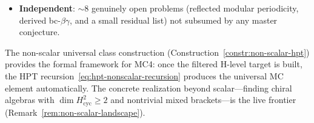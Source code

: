 \begin{remark}
\begin{itemize}
  conditions, AGT, Chern--Simons, and
  physics-dictionary statements
  (${\sim}20$ conjectures across
  Chapters~\ref{ch:feynman}, \ref{ch:bv-brst},
  \ref{ch:ht-boundary}, \ref{chap:physical-origins},
  \ref{ch:kontsevich-integral}).
  This is strictly downstream of MC3/MC4 and should not be read as a
  parallel structural frontier.
\item \textbf{Independent}: ${\sim}8$ genuinely open problems
  (reflected modular periodicity, derived bc-$\beta\gamma$, and a
  small residual list) not subsumed by any master conjecture.
\end{itemize}
The non-scalar universal class construction
(Construction~\ref{constr:non-scalar-hpt}) provides the formal
framework for MC4: once the filtered H-level target is built,
the HPT recursion~\eqref{eq:hpt-nonscalar-recursion} produces the
universal MC element automatically.  The concrete realization beyond
scalar---finding chiral algebras with
$\dim H^2_{\mathrm{cyc}} \geq 2$ and nontrivial mixed
brackets---is the live frontier
(Remark~\ref{rem:non-scalar-landscape}).
\end{remark}

